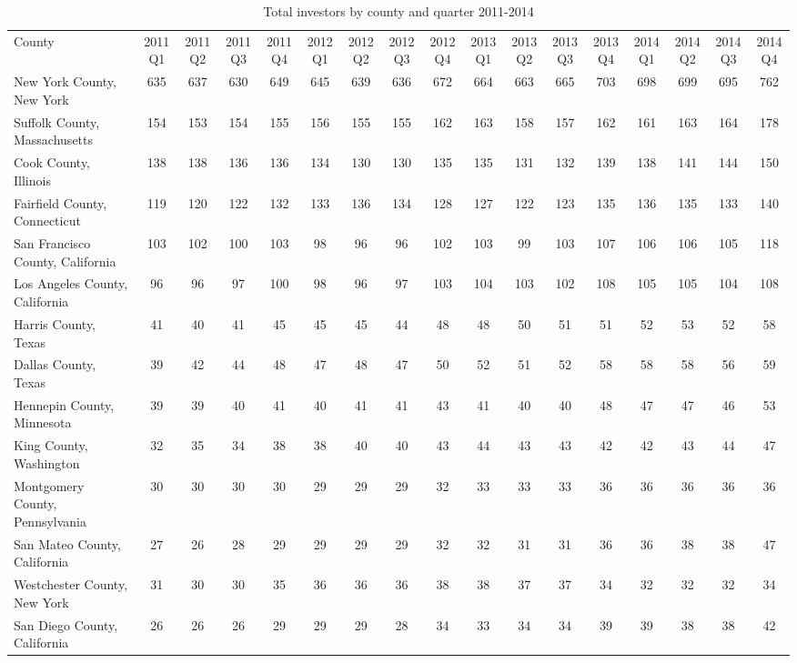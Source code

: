 \begin{landscape}
\begin{longtable}{lcccccccccccccccc}
	\setlength{\tabcolsep}{8pt}
				\caption[Total Investors by County and Quarter 2011-2014]{Total investors by county and quarter 2011-2014}
	County &2011Q1 &2011Q2 &2011Q3 &2011Q4 &2012Q1 &2012Q2 &2012Q3 &2012Q4 &2013Q1 & 2013Q2 &2013Q3 &2013Q4 &2014Q1 &2014Q2 &2014Q3 & 2014Q4 \\
	New York County, New York & 635 & 637 & 630 & 649 & 645 & 639 & 636 & 672 & 664 & 663 & 665 & 703 & 698 & 699 & 695 & 762 \\
	Suffolk County, Massachusetts & 154 & 153 & 154 & 155 & 156 & 155 & 155 & 162 & 163 & 158 & 157 & 162 & 161 & 163 & 164 & 178 \\
	Cook County, Illinois & 138 & 138 & 136 & 136 & 134 & 130 & 130 & 135 & 135 & 131 & 132 & 139 & 138 & 141 & 144 & 150 \\
	Fairfield County, Connecticut & 119 & 120 & 122 & 132 & 133 & 136 & 134 & 128 & 127 & 122 & 123 & 135 & 136 & 135 & 133 & 140 \\
	San Francisco County, California & 103 & 102 & 100 & 103 & 98 & 96 & 96 & 102 & 103 & 99 & 103 & 107 & 106 & 106 & 105 & 118 \\
	Los Angeles County, California & 96 & 96 & 97 & 100 & 98 & 96 & 97 & 103 & 104 & 103 & 102 & 108 & 105 & 105 & 104 & 108 \\
	Harris County, Texas & 41 & 40 & 41 & 45 & 45 & 45 & 44 & 48 & 48 & 50 & 51 & 51 & 52 & 53 & 52 & 58 \\
	Dallas County, Texas & 39 & 42 & 44 & 48 & 47 & 48 & 47 & 50 & 52 & 51 & 52 & 58 & 58 & 58 & 56 & 59 \\
	Hennepin County, Minnesota & 39 & 39 & 40 & 41 & 40 & 41 & 41 & 43 & 41 & 40 & 40 & 48 & 47 & 47 & 46 & 53 \\
	King County, Washington & 32 & 35 & 34 & 38 & 38 & 40 & 40 & 43 & 44 & 43 & 43 & 42 & 42 & 43 & 44 & 47 \\
	Montgomery County, Pennsylvania & 30 & 30 & 30 & 30 & 29 & 29 & 29 & 32 & 33 & 33 & 33 & 36 & 36 & 36 & 36 & 36 \\
	San Mateo County, California & 27 & 26 & 28 & 29 & 29 & 29 & 29 & 32 & 32 & 31 & 31 & 36 & 36 & 38 & 38 & 47 \\
	Westchester County, New York & 31 & 30 & 30 & 35 & 36 & 36 & 36 & 38 & 38 & 37 & 37 & 34 & 32 & 32 & 32 & 34 \\
	San Diego County, California & 26 & 26 & 26 & 29 & 29 & 29 & 28 & 34 & 33 & 34 & 34 & 39 & 39 & 38 & 38 & 42 \\

\end{longtable}
\end{landscape}

